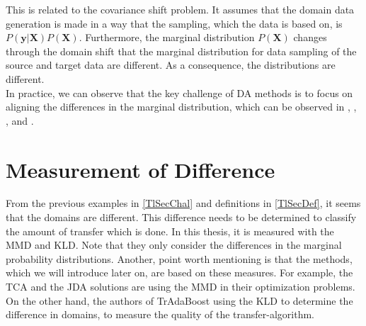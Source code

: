 This is related to the covariance shift problem.\cite{Pan.2011}
It assumes that the domain data generation is made in a way that the sampling, which the data is based on, is $P(\mathbf{y}\vert \mathbf{X})P(\mathbf{X})$.
Furthermore, the marginal distribution $P(\mathbf{X})$ changes through the domain shift that the marginal distribution for data sampling of the source and target data are different. As a consequence, the distributions are different.\cite[p. 8-9]{QuinoneroCandela.2009}\\
In practice, we can observe that the key challenge of \acl{DA} methods is to focus on aligning the differences in the marginal distribution, which can be observed in \cite{Pan.2011}, \cite{Long.}, \cite{Fernando.}, \cite{Arnold.2007} and \cite{Pan.2011}.

\FloatBarrier
\section{Measurement of Difference}\label{TlSecMeasure}
From the previous examples in \ref{TlSecChal} and definitions in \ref{TlSecDef}, it seems that the domains are different.
This difference needs to be determined to classify the amount of transfer which is done.
In this thesis, it is measured with the \ac{MMD} and \ac{KLD}.
Note that they only consider the differences in the marginal probability distributions.
Another, point worth mentioning is that the methods, which we will introduce later on, are based on these measures.
For example, the \acl{TCA} and the \acl{JDA} solutions are using the \acs{MMD} in their optimization problems.
On the other hand, the authors of TrAdaBoost using the \acs{KLD} to determine the difference in domains, to measure the quality of the transfer-algorithm.\cite{Long.}\cite{Pan.2011}\cite{Dai.}
